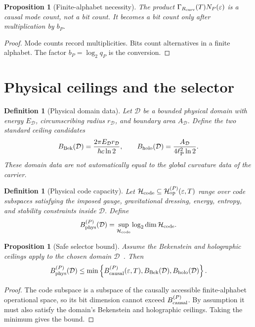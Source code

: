 \documentclass[11pt,a4paper]{article}
\newtheorem{proposition}[theorem]{Proposition}
\newtheorem{definition}[theorem]{Definition}
\newcommand{\ellP}{\ell_{\rm P}}
\begin{document}
\begin{proposition}[Finite-alphabet necessity]
The product $\Gamma_{R_{\rm curv}}(T)N_P(\varepsilon)$ is a causal mode count, not a bit count.  It becomes a bit count only after multiplication by $b_P$.
\end{proposition}
\begin{proof}
Mode counts record multiplicities.  Bits count alternatives in a finite alphabet.  The factor $b_P=\log_2q_P$ is the conversion.
\end{proof}

\section{Physical ceilings and the selector}
\label{sec:selector-bounds}

\begin{definition}[Physical domain data]
Let $\mathcal D$ be a bounded physical domain with energy $E_{\mathcal D}$, circumscribing radius $r_{\mathcal D}$, and boundary area $A_{\mathcal D}$.  Define the two standard ceiling candidates
\[
B_{\rm Bek}(\mathcal D)=
\frac{2\pi E_{\mathcal D}r_{\mathcal D}}{\hbar c\ln2},
\qquad
B_{\rm holo}(\mathcal D)=
\frac{A_{\mathcal D}}{4\ellP^2\ln2}.
\]
These domain data are not automatically equal to the global curvature data of the carrier.
\end{definition}

\begin{definition}[Physical code capacity]
Let $\mathcal H_{\rm code}\subseteq \mathcal H_{\rm op}^{(P)}(\varepsilon,T)$ range over code subspaces satisfying the imposed gauge, gravitational dressing, energy, entropy, and stability constraints inside $\mathcal D$.  Define
\[
B_{\rm phys}^{(P)}(\mathcal D)
=
\sup_{\mathcal H_{\rm code}}
\log_2\dim\mathcal H_{\rm code}.
\]
\end{definition}

\begin{proposition}[Safe selector bound]
Assume the Bekenstein and holographic ceilings apply to the chosen domain $\mathcal D$~\cite{Bekenstein1973,Bekenstein1981,Bousso2002}.  Then
\[
B_{\rm phys}^{(P)}(\mathcal D)
\le
\min\left\{
B_{\rm causal}^{(P)}(\varepsilon,T),
B_{\rm Bek}(\mathcal D),
B_{\rm holo}(\mathcal D)
\right\}.
\]
\end{proposition}
\begin{proof}
The code subspace is a subspace of the causally accessible finite-alphabet operational space, so its bit dimension cannot exceed $B_{\rm causal}^{(P)}$.  By assumption it must also satisfy the domain's Bekenstein and holographic ceilings.  Taking the minimum gives the bound.
\end{proof}
\end{document}
